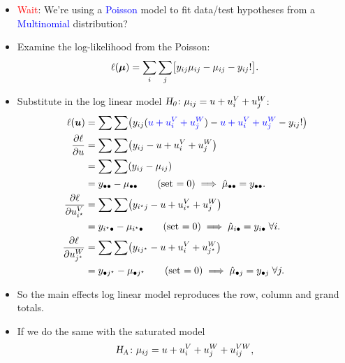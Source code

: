 \documentclass{article}\usepackage[]{graphicx}\usepackage[svgnames]{xcolor}
\let\exp\relax%
\let\log\relax%
\newcommand{\HN}{\textsl{H}_{\textsl{0}}}%
\newcommand{\HA}{\textsl{H}_{\textsl{A}}}%
\providecommand{\Vector}[1]{\bm{#1}}%
\begin{document}
\begin{itemize}
      \item \textcolor{Red}{Wait}: We're using a \textcolor{Blue}{Poisson} model to fit data/test hypotheses from a \textcolor{Blue}{Multinomial} distribution?
      \item Examine the log-likelihood from the Poisson:
            \[ \ell(\Vector{\mu})=\sum_i\sum_j\bigl[y_{ij}\log{\mu_{ij}}-\mu_{ij}-\log{y_{ij}!}\bigr]. \]
      \item Substitute in the log linear model \textcolor{Blue}{$ \HN\colon \log{\mu_{ij}}=u+u_i^V+u_j^W $}:
            \begin{align*}
                  \ell(\Vector{u})
                                & =\sum\sum\bigl(y_{ij}(\textcolor{Blue}{u+u_i^V+u_j^W})-\exp{\textcolor{Blue}{u+u_i^V+u_j^W}}-\log{y_{ij}!}\bigr)          \\
                  \pdv{\ell}{u} & =\sum\sum\bigl(y_{ij}-\exp{u+u_i^V+u_j^W}\bigr)                                                                           \\
                                & =\sum\sum(y_{ij}-\mu_{ij})                                                                                                \\
                                & =y_{\bullet\bullet}-\mu_{\bullet\bullet}\qquad \text{(set $=0$)}\implies \hat{\mu}_{\bullet\bullet}=y_{\bullet\bullet}.   \\
                  \pdv{\ell}{u_{i^\star}^V}
                                & =\sum\sum\bigl(y_{i^\star j}-\exp{u+u_{i^\star}^V+u_j^W}\bigr)                                                            \\
                                & =y_{i^\star\bullet}-\mu_{i^\star\bullet}\qquad \text{(set $=0$)}\implies\hat{\mu}_{i\bullet}=y_{i\bullet}\;\forall i.     \\
                  \pdv{\ell}{u_{j^\star}^W}
                                & =\sum\sum\bigl(y_{ij^\star}-\exp{u+u_{i}^V+u_{j^\star}^W}\bigr)                                                           \\
                                & =y_{\bullet j^\star}-\mu_{\bullet j^\star}\qquad \text{(set $=0$)}\implies\hat{\mu}_{\bullet j}=y_{\bullet j}\;\forall j.
            \end{align*}
      \item So the main effects log linear model reproduces the row, column and grand totals.
      \item If we do the same with the saturated model
            \[ \HA\colon\log{\mu_{ij}}=u+u_i^V+u_j^W+u_{ij}^{VW}, \]

\end{itemize}
\end{document}
